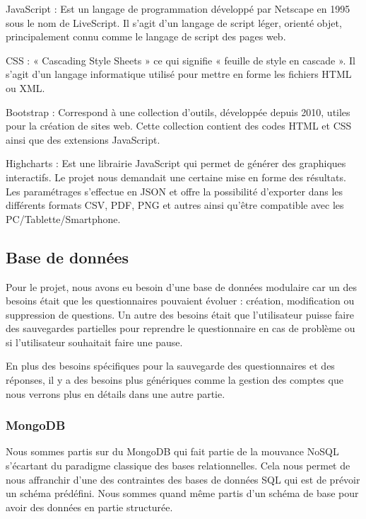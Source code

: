 JavaScript : Est un langage de programmation développé par Netscape en 1995 sous le nom de LiveScript. Il s'agit d'un langage de script léger, orienté objet, principalement connu comme le langage de script des pages web. \

CSS : « Cascading Style Sheets » ce qui signifie « feuille de style en cascade ». 
Il s'agit d'un langage informatique utilisé pour mettre en forme les fichiers HTML ou XML. \

Bootstrap : Correspond à une collection d'outils, développée depuis 2010, utiles pour la création de sites web. Cette collection contient des codes HTML et CSS ainsi que des extensions JavaScript. \  

Highcharts : Est une librairie JavaScript qui permet de générer des graphiques interactifs. Le projet nous demandait une certaine mise en forme des résultats. Les paramétrages s'effectue en JSON et offre la possibilité d'exporter dans les différents formats CSV, PDF, PNG et autres ainsi qu'être compatible avec les PC/Tablette/Smartphone.

\subsection{Base de données}

Pour le projet, nous avons eu besoin d'une base de données modulaire car un des besoins était que les questionnaires pouvaient évoluer : création, modification ou suppression de questions. Un autre des besoins était que l'utilisateur puisse faire des sauvegardes partielles pour reprendre le questionnaire en cas de problème ou si l'utilisateur souhaitait faire une pause. 

En plus des besoins spécifiques pour la sauvegarde des questionnaires et des réponses, il y a des besoins plus génériques comme la gestion des comptes que nous verrons plus en détails dans une autre partie.

\subsubsection{MongoDB}

Nous sommes partis sur du MongoDB qui fait partie de la mouvance NoSQL s'écartant du paradigme classique des bases relationnelles. Cela nous permet de nous affranchir d'une des contraintes des bases de données SQL qui est de prévoir un schéma prédéfini. Nous sommes quand même partis d'un schéma de base pour avoir des données en partie structurée.

